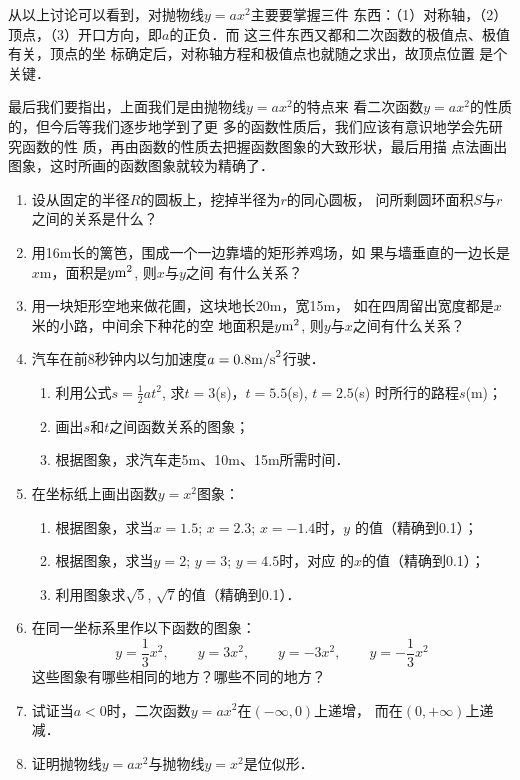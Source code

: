 从以上讨论可以看到，对抛物线$y=ax^2$主要要掌握三件
东西：（1）对称轴，（2）顶点，（3）开口方向，即$a$的正负．而
这三件东西又都和二次函数的极值点、极值有关，顶点的坐
标确定后，对称轴方程和极值点也就随之求出，故顶点位置
是个关键．

最后我们要指出，上面我们是由抛物线$y=ax^2$的特点来
看二次函数$y=ax^2$的性质的，但今后等我们逐步地学到了更
多的函数性质后，我们应该有意识地学会先研究函数的性
质，再由函数的性质去把握函数图象的大致形状，最后用描
点法画出图象，这时所画的函数图象就较为精确了．


\begin{ex}
\begin{enumerate}
    \item 设从固定的半径$R$的圆板上，挖掉半径为$r$的同心圆板，
    问所剩圆环面积$S$与$r$之间的关系是什么？
    \item 用16m长的篱笆，围成一个一边靠墙的矩形养鸡场，如
    果与墙垂直的一边长是$x$m，面积是$y{\rm m}^2$, 则$x$与$y$之间
    有什么关系？
    \item     用一块矩形空地来做花圃，这块地长20m，宽15m，
    如在四周留出宽度都是$x$米的小路，中间余下种花的空
地面积是$y{\rm m}^2$, 则$y$与$x$之间有什么关系？
\item  汽车在前8秒钟内以匀加速度$a=0.8{\rm m/s}^2$行驶．
\begin{enumerate}
\item 利用公式$s=\frac{1}{2}at^2$, 求$t=3$(s)，$t=5.5$(s), $t=2.5$(s) 时所行的路程$s$(m)；
\item 画出$s$和$t$之间函数关系的图象；
\item 根据图象，求汽车走5m、10m、15m所需时间．
\end{enumerate}

\item  
在坐标纸上画出函数$y=x^2$图象：
\begin{enumerate}
\item 根据图象，求当$x=1.5$; $x=2.3$; $x=-1.4$时，$y$
的值（精确到0.1）；
\item 根据图象，求当$y=2$; $y=3$; $y=4.5$时，对应
的$x$的值（精确到0.1）；
\item 利用图象求$\sqrt{5}$, $\sqrt{7}$的值（精确到0.1）．
\end{enumerate}

\item   在同一坐标系里作以下函数的图象：
$$y=\frac{1}{3}x^2,\qquad y=3x^2,\qquad y=-3x^2,\qquad y=-\frac{1}{3}x^2$$
这些图象有哪些相同的地方？哪些不同的地方？
\item  试证当$a<0$时，二次函数$y=ax^2$在$(-\infty,0)$上递增，
而在$(0,+\infty)$上递减．
\item   证明抛物线$y=ax^2$与抛物线$y=x^2$是位似形．
\end{enumerate}
\end{ex}

